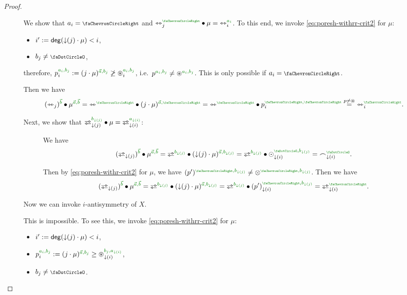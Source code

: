 \documentclass[a4paper]{memoir}
\begin{document}
\begin{proof}
\begin{enumerate}
\begin{description}
			\item[]
			We show that $a_i = \ypolar$ and $\equijetsym_j\pmry \oriof \mu = \equijetsym_i\pmr{a_i}$.
			To this end, we invoke \cref{eq:poresh-withrr-crit2} for $\mu$:
			\begin{itemize}
				\item $i' := \mathsf{deg}({\downarrow}(j) \cdot \mu) < i$,
				\item $b_j \neq \npolar$,
			\end{itemize}
			therefore, $p_i\pmrhom{a_i}{b_j} := (j \cdot \mu)\pmrhom{\vec a}{b_j} \not\geq \isopol_i\pmrhom{a_i}{b_j}$, i.e.\ $p\pmrhom{a_i}{b_j} \neq \isopol\pmrhom{a_i}{b_j}$.
			This is only possible if $a_i = \ypolar$.
			
			Then we have
			\[
				(\equijetsym_j)\pmr{\vec b} \oriof \mu\pmrhom{\vec a}{\vec b}
				= \equijetsym\pmry \oriof (j \cdot \mu)\pmrhom{\vec a}{\ypolar}
				= \equijetsym\pmry \oriof p_i\pmryy
				\overset{p \neq \isopol}{=} \equijetsym_i\pmry.
			\]
			
			Next, we show that $\infrajetsym_{\predeg(j)}\pmr{b_{\predeg(j)}} \oriof \mu = \infrajetsym_{\predeg(i)}\pmr{a_{\predeg(i)}}$:
			\begin{description}
				\item[] We have
				\[
					(\infrajetsym_{\predeg(j)})\pmr{\vec b} \oriof \mu\pmrhom{\vec a}{\vec b}
					= \infrajetsym\pmr{b_{\predeg(j)}} \oriof (\predeg(j) \cdot \mu)\pmrhom{\vec a}{b_{\predeg(j)}}
					= \infrajetsym\pmr{b_{\predeg(j)}} \oriof \nonpol_{\predeg(i)}\pmrhom{\npolar}{b_{\predeg(j)}}
					= \edgesym_{\predeg(i)}\pmr{\npolar}.
				\]
				\item[]
				Then by \cref{eq:poresh-withr-crit2} for $\mu$, we have $(p')\pmrhom{\ypolar}{b_{\predeg(j)}} \neq \mixpol\pmrhom{\ypolar}{b_{\predeg(j)}}$.
				Then we have
				\[
					(\infrajetsym_{\predeg(j)})\pmr{\vec b} \oriof \mu\pmrhom{\vec a}{\vec b}
					= \infrajetsym\pmr{b_{\predeg(j)}} \oriof (\predeg(j) \cdot \mu)\pmrhom{\vec a}{b_{\predeg(j)}}
					= \infrajetsym\pmr{b_{\predeg(j)}} \oriof (p')_{\predeg(i)}\pmrhom{\ypolar}{b_{\predeg(j)}}
					= \infrajetsym_{\predeg(i)}\pmry.
				\]
			\end{description}
			
			Now we can invoke $i$-antisymmetry of $X$.
			
			\item[]
			This is impossible.
			To see this, we invoke \cref{eq:poresh-withrr-crit2} for $\mu$:
			\begin{itemize}
				\item $i' := \mathsf{deg}({\downarrow}(j) \cdot \mu) < i$,
				\item $p_i\pmrhom{a_i}{b_j} := (j \cdot \mu)\pmrhom{\vec a}{b_j} \geq \isopol_{\predeg(i)}\pmrhom{b_j}{a_{\predeg(i)}}$,
				\item $b_j \neq \npolar$. \qedhere
			\end{itemize}
		\end{description}
	\end{enumerate}
\end{proof}
\end{document}
